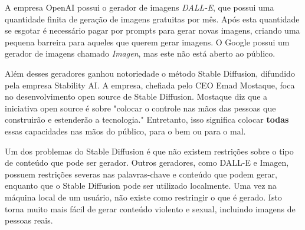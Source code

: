 A empresa OpenAI possui o gerador de imagens \textit{DALL-E}, que possui uma quantidade finita de geração de imagens gratuitas por mês. Após esta quantidade se esgotar é necessário pagar por prompts para gerar novas imagens, criando uma pequena barreira para aqueles que querem gerar imagens. O Google possui um gerador de imagens chamado \textit{Imagen}, mas este não está aberto ao público.

Além desses geradores ganhou notoriedade o método Stable Diffusion, difundido pela empresa Stability AI. A empresa, chefiada pelo CEO Emad Mostaque, foca no desenvolvimento open source de Stable Diffusion. Mostaque diz que a iniciativa open source é sobre "colocar o controle nas mãos das pessoas que construirão e estenderão a tecnologia." Entretanto, isso significa colocar \textbf{todas} essas capacidades nas mãos do público, para o bem ou para o mal.

Um dos problemas do Stable Diffusion é que não existem restrições sobre o tipo de conteúdo que pode ser gerador. Outros geradores, como DALL-E e Imagen, possuem restrições severas nas palavras-chave e conteúdo que podem gerar, enquanto que o Stable Diffusion pode ser utilizado localmente. Uma vez na máquina local de um usuário, não existe como restringir o que é gerado. Isto torna muito mais fácil de gerar conteúdo violento e sexual, incluindo imagens de pessoas reais.

